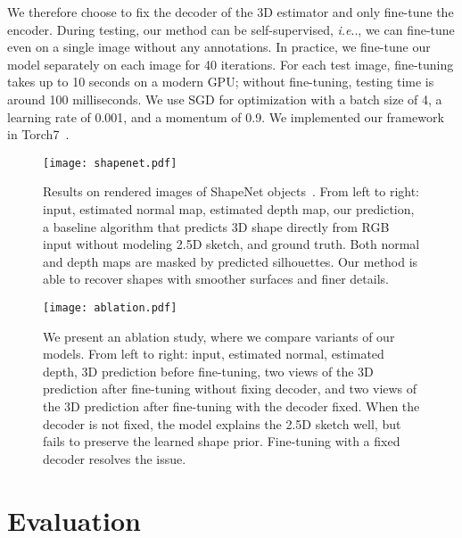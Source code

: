 \documentclass{article}
\makeatletter
\DeclareRobustCommand\onedot{\futurelet\@let@token\@onedot}
\def\@onedot{\ifx\@let@token.\else.\null\fi\xspace}
\def\ie{\emph{i.e}\onedot} \def\Ie{\emph{I.e}\onedot}
\makeatother
\begin{document}
We therefore choose to fix the decoder of the 3D estimator and only fine-tune the encoder. During testing, our method can be self-supervised, \ie, we can fine-tune even on a single image without any annotations. In practice, we fine-tune our model separately on each image for 40 iterations. For each test image, fine-tuning takes up to 10 seconds on a modern GPU; without fine-tuning, testing time is around 100 milliseconds. We use SGD for optimization with a batch size of 4, a learning rate of 0.001, and a momentum of 0.9. We implemented our framework in Torch7~\citep{Collobert2011}. 

\begin{figure}[t]
    \centering
    \texttt{[image: shapenet.pdf]}
    \vspace{-10pt}
    \caption{Results on rendered images of ShapeNet objects~\citep{Chang2015}. From left to right: input, estimated normal map, estimated depth map, our prediction, a baseline algorithm that predicts 3D shape directly from RGB input without modeling 2.5D sketch, and ground truth. Both normal and depth maps are masked by predicted silhouettes. Our method is able to recover shapes with smoother surfaces and finer details.}
    \vspace{-5pt}
    \label{fig:shapenet}
\end{figure} \begin{figure}[t]
    \centering
    \texttt{[image: ablation.pdf]}
    \caption{We present an ablation study, where we compare variants of our models. From left to right: input, estimated normal, estimated depth, 3D prediction before fine-tuning, two views of the 3D prediction after fine-tuning without fixing decoder, and two views of the 3D prediction after fine-tuning with the decoder fixed. When the decoder is not fixed, the model explains the 2.5D sketch well, but fails to preserve the learned shape prior. Fine-tuning with a fixed decoder resolves the issue.}
    \vspace{-5pt}
    \label{fig:ablation}
\end{figure}  \section{Evaluation}
\label{sec:eval}
\end{document}
